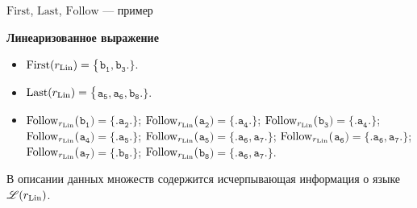 \documentclass[mathserif]{beamer}
\newcommand{\Lang}{\mathscr{L}} %
\def\First{\mathrm{First}} %
\def\Last{\mathrm{Last}}
\def\Follow{\mathrm{Follow}}
\def\regexpstr#1{\mathtt{#1}}%
\begin{document}
\begin{frame}{$\First$, $\Last$, $\Follow$ --- пример}
{  \begin{exampleblock}{\bf Линеаризованное выражение}
    \begin{itemize}
      \item $\First(r_{\rm Lin})=\bigl\lbrace\bigr.${}$\regexpstr{b_{1}},\regexpstr{b_{3}}${}$\bigl.\bigr\rbrace$. %
      \item $\Last(r_{\rm Lin})=\bigl\lbrace\bigr.${}$\regexpstr{a_{5}},\regexpstr{a_{6}},\regexpstr{b_{8}}${}$\bigl.\bigr\rbrace$. %
      \item $\Follow_{r_{\rm Lin}}(${}$\regexpstr{b_{1}}${}$)=\bigl\lbrace\bigr.${}$\regexpstr{a_{2}}${}$\bigl.\bigr\rbrace$; $\Follow_{r_{\rm Lin}}(${}$\regexpstr{a_{2}}${}$)=\bigl\lbrace\bigr.${}$\regexpstr{a_{4}}${}$\bigl.\bigr\rbrace$; $\Follow_{r_{\rm Lin}}(${}$\regexpstr{b_{3}}${}$)=\bigl\lbrace\bigr.${}$\regexpstr{a_{4}}${}$\bigl.\bigr\rbrace$; $\Follow_{r_{\rm Lin}}(${}$\regexpstr{a_{4}}${}$)=\bigl\lbrace\bigr.${}$\regexpstr{a_{5}}${}$\bigl.\bigr\rbrace$; $\Follow_{r_{\rm Lin}}(${}$\regexpstr{a_{5}}${}$)=\bigl\lbrace\bigr.${}$\regexpstr{a_{6}},\regexpstr{a_{7}}${}$\bigl.\bigr\rbrace$; $\Follow_{r_{\rm Lin}}(${}$\regexpstr{a_{6}}${}$)=\bigl\lbrace\bigr.${}$\regexpstr{a_{6}},\regexpstr{a_{7}}${}$\bigl.\bigr\rbrace$; $\Follow_{r_{\rm Lin}}(${}$\regexpstr{a_{7}}${}$)=\bigl\lbrace\bigr.${}$\regexpstr{b_{8}}${}$\bigl.\bigr\rbrace$; $\Follow_{r_{\rm Lin}}(${}$\regexpstr{b_{8}}${}$)=\bigl\lbrace\bigr.${}$\regexpstr{a_{6}},\regexpstr{a_{7}}${}$\bigl.\bigr\rbrace$. %
    \end{itemize}
  \end{exampleblock}
  В описании данных множеств содержится исчерпывающая информация о языке $\Lang(r_{\rm Lin})$. %
  }
\end{frame}
\end{document}
